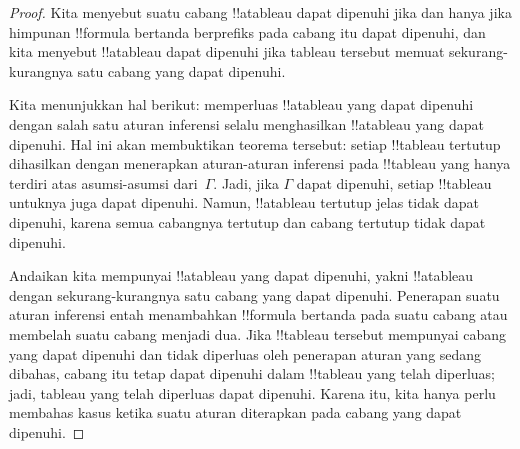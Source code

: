 \documentclass[../../../include/open-logic-section]{subfiles}
\begin{document}
\begin{proof}
Kita menyebut suatu cabang !!a{tableau} dapat dipenuhi jika dan hanya jika
himpunan !!{formula} bertanda berprefiks pada cabang itu dapat dipenuhi, dan
kita menyebut !!a{tableau} dapat dipenuhi jika tableau tersebut memuat
sekurang-kurangnya satu cabang yang dapat dipenuhi.

Kita menunjukkan hal berikut: memperluas !!a{tableau} yang dapat dipenuhi
dengan salah satu aturan inferensi selalu menghasilkan !!a{tableau} yang
dapat dipenuhi. Hal ini akan membuktikan teorema tersebut: setiap
!!{tableau} tertutup dihasilkan dengan menerapkan aturan-aturan inferensi
pada !!{tableau} yang hanya terdiri atas asumsi-asumsi dari~$\Gamma$. Jadi,
jika $\Gamma$ dapat dipenuhi, setiap !!{tableau} untuknya juga dapat
dipenuhi. Namun, !!a{tableau} tertutup jelas tidak dapat dipenuhi, karena
semua cabangnya tertutup dan cabang tertutup tidak dapat dipenuhi.

Andaikan kita mempunyai !!a{tableau} yang dapat dipenuhi, yakni !!a{tableau}
dengan sekurang-kurangnya satu cabang yang dapat dipenuhi. Penerapan suatu
aturan inferensi entah menambahkan !!{formula} bertanda pada suatu cabang
atau membelah suatu cabang menjadi dua. Jika !!{tableau} tersebut mempunyai
cabang yang dapat dipenuhi dan tidak diperluas oleh penerapan aturan yang
sedang dibahas, cabang itu tetap dapat dipenuhi dalam !!{tableau} yang telah
diperluas; jadi, tableau yang telah diperluas dapat dipenuhi. Karena itu,
kita hanya perlu membahas kasus ketika suatu aturan diterapkan pada cabang
yang dapat dipenuhi.


\end{proof}
\end{document}

